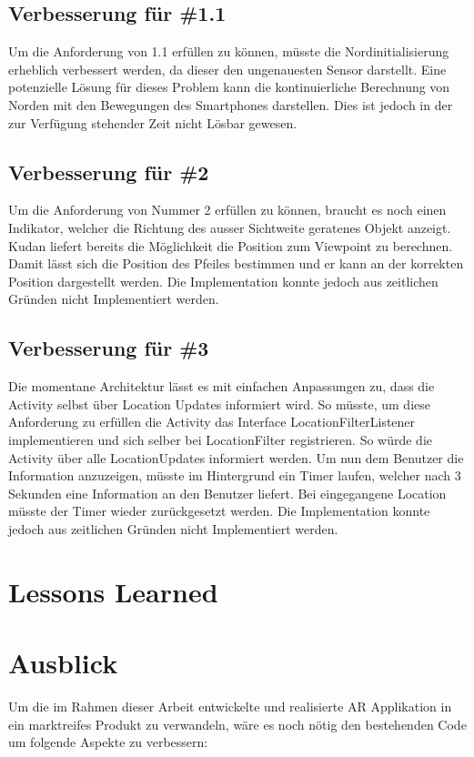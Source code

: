 \documentclass[a4paper]{scrreprt}
\begin{document}
\subsection{Verbesserung für \#1.1}
Um die Anforderung von 1.1  erfüllen zu können, müsste die Nordinitialisierung erheblich verbessert werden, da dieser den ungenauesten Sensor darstellt. Eine potenzielle Lösung für dieses Problem kann die kontinuierliche Berechnung von Norden mit den Bewegungen des Smartphones darstellen. Dies ist jedoch in der zur Verfügung stehender Zeit nicht Lösbar gewesen.

\subsection{Verbesserung für \#2}
Um die Anforderung von Nummer 2 erfüllen zu können, braucht es noch einen Indikator, welcher die Richtung des ausser Sichtweite geratenes Objekt anzeigt. Kudan liefert bereits die Möglichkeit die Position zum Viewpoint zu berechnen. Damit lässt sich die Position des Pfeiles bestimmen und er kann an der korrekten Position dargestellt werden. Die Implementation konnte jedoch aus zeitlichen Gründen nicht Implementiert werden.

\subsection{Verbesserung für \#3}
Die momentane Architektur lässt es mit einfachen Anpassungen zu, dass die Activity selbst über Location Updates informiert wird. So müsste, um diese Anforderung zu erfüllen die Activity das Interface LocationFilterListener implementieren und sich selber bei LocationFilter registrieren. So würde die Activity über alle LocationUpdates informiert werden. Um nun dem Benutzer die Information anzuzeigen, müsste im Hintergrund ein Timer laufen, welcher nach 3 Sekunden eine Information an den Benutzer liefert. Bei eingegangene Location müsste der Timer wieder zurückgesetzt werden.
Die Implementation konnte jedoch aus zeitlichen Gründen nicht Implementiert werden. 

\section{Lessons Learned}

\section{Ausblick}
Um die im Rahmen dieser Arbeit entwickelte und realisierte AR Applikation in ein marktreifes Produkt zu verwandeln, wäre es noch nötig den bestehenden Code um folgende Aspekte zu verbessern:
\end{document}

